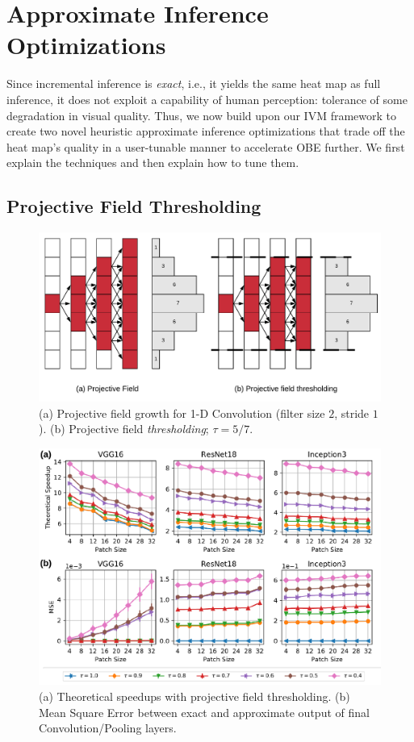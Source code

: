 \vspace{-2mm}
\section{Approximate Inference Optimizations}\label{sec:approx}
Since incremental inference is \textit{exact}, i.e., it yields the same heat map as full inference, it does not exploit a capability of human perception: tolerance of some degradation in visual quality. Thus, we now build upon our IVM framework to create two novel heuristic approximate inference optimizations that trade off the heat map's quality in a user-tunable manner to accelerate OBE further. We first explain the techniques and then explain how to tune them.

\subsection{Projective Field Thresholding}

\begin{figure}[t]
\includegraphics[width=\columnwidth]{images/pf_truncate}
\caption{(a) Projective field growth for 1-D Convolution (filter size $2$, stride $1$). (b) Projective field \textit{thresholding}; $\tau = 5/7$.}
\label{fig:pf_truncate}
\end{figure}

\begin{figure}[t]
\includegraphics[width=\columnwidth]{images/proj_thresholding}
\caption{(a) Theoretical speedups with projective field thresholding. (b) Mean Square Error between exact and approximate output of final Convolution/Pooling layers.}
\label{fig:proj_thresholding}
\vspace{-4mm}
\end{figure}


